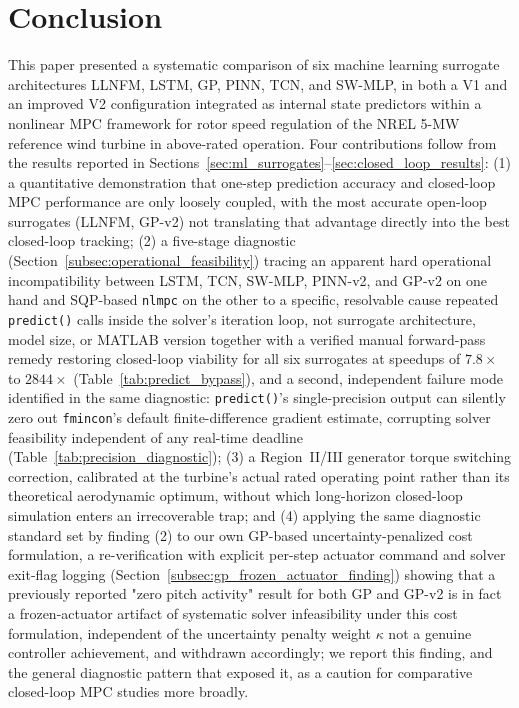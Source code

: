 
\section{Conclusion}
\label{sec:conclusion}

This paper presented a systematic comparison of six machine learning
surrogate architectures  LLNFM, LSTM, GP, PINN, TCN, and SW-MLP, in both
a V1 and an improved V2 configuration  integrated as internal state
predictors within a nonlinear MPC framework for rotor speed regulation of
the NREL 5-MW reference wind turbine in above-rated operation. Four
contributions follow from the results reported in
Sections~\ref{sec:ml_surrogates}--\ref{sec:closed_loop_results}:
(1) a quantitative demonstration that one-step prediction accuracy and
closed-loop MPC performance are only loosely coupled, with the most
accurate open-loop surrogates (LLNFM, GP-v2) not translating that
advantage directly into the best closed-loop tracking; (2) a five-stage
diagnostic (Section~\ref{subsec:operational_feasibility}) tracing an
apparent hard operational incompatibility between LSTM, TCN, SW-MLP,
PINN-v2, and GP-v2 on one hand and SQP-based \texttt{nlmpc} on the
other to a specific, resolvable cause  repeated \texttt{predict()}
calls inside the solver's iteration loop, not surrogate architecture,
model size, or MATLAB version  together with a verified manual
forward-pass remedy restoring closed-loop viability for all six
surrogates at speedups of $7.8\times$ to $2844\times$
(Table~\ref{tab:predict_bypass}), and a second, independent failure
mode identified in the same diagnostic: \texttt{predict()}'s
single-precision output can silently zero out \texttt{fmincon}'s
default finite-difference gradient estimate, corrupting solver
feasibility independent of any real-time deadline
(Table~\ref{tab:precision_diagnostic}); (3) a Region~II/III generator torque
switching correction, calibrated at the turbine's actual rated operating
point rather than its theoretical aerodynamic optimum, without which
long-horizon closed-loop simulation enters an irrecoverable trap; and
(4) applying the same diagnostic standard set by finding (2) to our own
GP-based uncertainty-penalized cost formulation, a re-verification with
explicit per-step actuator command and solver exit-flag logging
(Section~\ref{subsec:gp_frozen_actuator_finding}) showing that a
previously reported "zero pitch activity" result for both GP and
GP-v2 is in fact a frozen-actuator artifact of systematic solver
infeasibility under this cost formulation, independent of the
uncertainty penalty weight $\kappa$  not a genuine controller
achievement, and withdrawn accordingly; we report this finding, and
the general diagnostic pattern that exposed it, as a caution for
comparative closed-loop MPC studies more broadly.

